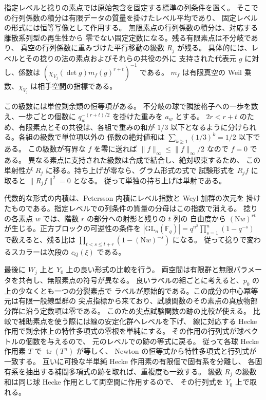 指定レベルと捻りの素点では原始包含を固定する標準の列条件を置く。
そこでの行列係数の積分は有限データの質量を掛けたレベル平均であり、
固定レベルの形式には恒等写像として作用する。
無限素点の行列係数の積分は、対応する離散系列型の再生性から
零でない固定定数になる。残る有限素点は不分岐であり、
真空の行列係数に重みづけた平行移動の級数 \(R_j\) が残る。
具体的には、レベルとその捻りの法の素点およびそれらの共役の外に
支持された代表元 \(g\) に対し、係数は
\((\chi_{V_j}(\det g)m_f(g)^{r+t})^{-1}\) である。
\(m_f\) は有限真空の Weil 乗数、\(\chi_{V_j}\) は相手空間の指標である。

この級数には単位剰余類の恒等項がある。
不分岐の球で隣接格子への一歩を数え、一歩ごとの個数に
\(q_w^{-(r+t)/2}\) を掛けた重みを \(a_w\) とする。
\(2r<r+t\) のため、有限素点とその共役は、各組で重みの和が
\(1/3\) 以下となるように分けられる。各組の級数で単位項以外の
係数の絶対値和は \(\sum_{k\ge1}(1/3)^k=1/2\) 以下である。
この級数が有界な \(f\) を零に送れば
\(\|f\|_\infty\le\|f\|_\infty/2\) なので \(f=0\) である。
異なる素点に支持された級数は合成で結合し、絶対収束するため、
この単射性が \(R_j\) に移る。持ち上げが零なら、グラム形式の式で
試験形式を \(R_j f\) に取ると \(\|R_j f\|^2=0\) となる。
従って単独の持ち上げは単射である。

代数的な形式の内積は、Petersson 内積にレベル指数と Weyl 加群の次元を
掛けたものである。指定レベルでの列条件の質量の分母はこの指数で消える。
捻りの各素点 \(w\) では、階数 \(r\) の部分への射影と残りの \(t\) 列の
自由度から \((\mathrm Nw)^{rt}\) が生じる。正方ブロックの可逆性の条件を
\(|\mathrm{GL}_n(\mathbb F_q)|=q^{n^2}\prod_{s=1}^n(1-q^{-s})\)
で数えると、残る比は \(\prod_{t<s\le t+r}(1-(\mathrm Nw)^{-s})\) になる。
従って捻りで変わるスカラーは次段の \(c_Q(\xi)\) である。

最後に \(W_j\) 上と \(Y_0\) 上の良い形式の比較を行う。
両空間は有限群と無限パラメータを共有し、無限素点の符号が異なる。
良いラベルの組ごとに考えると、\(p_0\) の上の少なくとも一つの分裂素点で
ラベルが原始的である。この成分の中心冪等元は有限一般線型群の
尖点指標から来ており、試験関数のその素点の真放物部分群に沿う定数項は零である。
このため尖点試験関数の跡の比較が使える。
比較で補助素点を使う際には線の安定化群へレベルを下げ、
線に対応する Hecke 作用で剰余体上の特性多項式の零根を単純にする。
その作用の行列式が球ベクトルの個数を与えるので、
元のレベルでの跡の等式に戻る。
従って各球 Hecke 作用素 \(T\) で \(\operatorname{tr}(T^n)\) が等しく、
Newton の恒等式から特性多項式と行列式が一致する。
互いに可換な半単純 Hecke 作用素の有限個で固有系を分離し、
各固有系を抽出する補間多項式の跡を取れば、重複度も一致する。
級数 \(R_j\) の級数和は同じ球 Hecke 作用として両空間に作用するので、
その行列式を \(Y_0\) 上で取れる。
